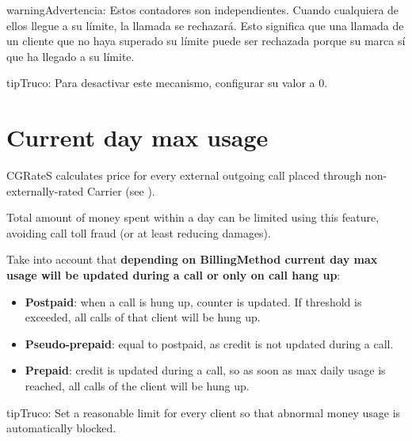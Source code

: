 \documentclass[letterpaper,10pt,spanish]{sphinxmanual}
\begin{document}
\begin{notice}{warning}{Advertencia:}
Estos contadores son independientes. Cuando cualquiera de ellos llegue a su límite, la llamada se rechazará. Esto significa que una llamada de un cliente que no haya superado su límite puede ser rechazada porque su marca sí que ha llegado a su límite.
\end{notice}

\begin{notice}{tip}{Truco:}
Para desactivar este mecanismo, configurar su valor a 0.
\end{notice}


\section{Current day max usage}
\label{security_and_maintenance/security/current_day_max_usage:current-day-max-usage}\label{security_and_maintenance/security/current_day_max_usage::doc}\label{security_and_maintenance/security/current_day_max_usage:id1}
CGRateS calculates price for every external outgoing call placed through non-externally-rated Carrier (see {\hyperref[administration_portal/brand/billing/index:billing]{}}).

Total amount of money spent within a day can be limited using this feature, avoiding call toll fraud (or at least
reducing damages).

Take into account that \textbf{depending on BillingMethod current day max usage will be updated during a call or only on call hang up}:
\begin{itemize}
\item {} 
\textbf{Postpaid}: when a call is hung up, counter is updated. If threshold is exceeded, all calls of that client will be hung up.

\item {} 
\textbf{Pseudo-prepaid}: equal to postpaid, as credit is not updated during a call.

\item {} 
\textbf{Prepaid}: credit is updated during a call, so as soon as max daily usage is reached, all calls of the client will be hung up.

\end{itemize}

\begin{notice}{tip}{Truco:}
Set a reasonable limit for every client so that abnormal money usage is automatically blocked.
\end{notice}
\end{document}

